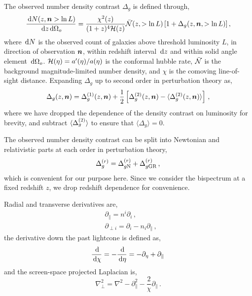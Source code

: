 The observed number density contrast $\Delta_g$ is defined through, 
\begin{equation}
	\frac{\,\mathrm{d} N(z, \bm {n} > \ln L)}{\,\mathrm{d} z \,\mathrm{d} \Omega_o} = \frac{\chi^2(z)}{(1 + z)^4 \mathcal{H}(z)} \bar{\mathcal{N}}(z, > \ln L) \left[ 1 + \Delta_g(z, \bm {n}, >\ln L) \right],
\end{equation}
where $\,\mathrm{d} N$ is the observed count of galaxies above threshold luminosity $L$, in direction of observation $\bm {n}$, within redshift interval $\,\mathrm{d} z$ and within solid angle element $\,\mathrm{d} \Omega_o$. $\mathcal{H}(\eta) = a'(\eta)/a(\eta)$ is the conformal hubble rate, $\bar{\mathcal{N}}$ is the background magnitude-limited number density, and $\chi$ is the comoving line-of-sight distance. Expanding $\Delta_g$ up to second order in perturbation theory as, 
\begin{equation}
	\Delta_g(z,\bm {n}) = \Delta_g^{(1)}(z, \bm {n}) + \frac{1}{2} \left[ \Delta_g^{(2)}(z,\bm {n}) - \langle \Delta_g^{(2)}(z,\bm {n})\rangle \right]\,,
\end{equation}
where we have dropped the dependence of the density contrast on luminosity for brevity, and subtract $\langle \Delta_g^{(2)} \rangle$ to ensure that $\langle \Delta_g \rangle = 0$. 

The observed number density contrast can be split into Newtonian and relativistic parts at each order in perturbation theory,
\begin{equation}
	\Delta_g^{(r)} = \Delta_{g \mathrm{N}}^{(r)} + \Delta_{g \mathrm{GR}}^{(r)}\,,
\end{equation}
which is convenient for our purpose here. Since we consider the bispectrum at a fixed redshift $z$, we drop redshift dependence for convenience. 

Radial and transverse derivatives are, 
\begin{align}
	&\partial_{\parallel} = n^i \partial_i\,, \\
	&\partial_{\perp i} = \partial_i - n_i \partial_\parallel\,,
\end{align}
the derivative down the past lightcone is defined as, 
\begin{equation}
	\frac{\,\mathrm{d}}{\,\mathrm{d} \chi} = - \frac{\,\mathrm{d}}{\,\mathrm{d} \eta} = - \partial_\eta + \partial_\parallel\,
\end{equation}
and the screen-space projected Laplacian is, 
\begin{equation}
	\nabla^2_\perp = \nabla^2 - \partial_\parallel^2 - \frac{2}{\chi} \partial_\parallel\,.
\end{equation}

